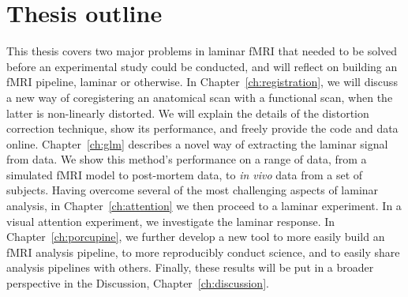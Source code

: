 
\section*{Thesis outline}
This thesis covers two major problems in laminar fMRI that needed to be solved before an experimental study could be conducted, and will reflect on building an fMRI pipeline, laminar or otherwise. In Chapter~\ref{ch:registration}, we will discuss a new way of coregistering an anatomical scan with a functional scan, when the latter is non-linearly distorted. We will explain the details of the distortion correction technique, show its performance, and freely provide the code and data online. Chapter~\ref{ch:glm} describes a novel way of extracting the laminar signal from data. We show this method's performance on a range of data, from a simulated fMRI model to post-mortem data, to \emph{in vivo} data from a set of subjects. Having overcome several of the most challenging aspects of laminar analysis, in Chapter~\ref{ch:attention} we then proceed to a laminar experiment. In a visual attention experiment, we investigate the laminar response. In Chapter~\ref{ch:porcupine}, we further develop a new tool to more easily build an fMRI analysis pipeline, to more reproducibly conduct science, and to easily share analysis pipelines with others. Finally, these results will be put in a broader perspective in the Discussion, Chapter~\ref{ch:discussion}.